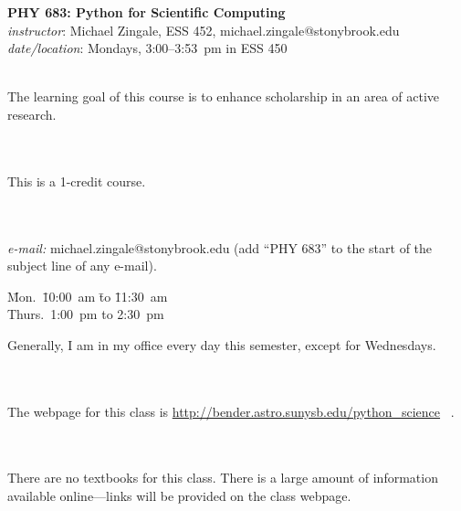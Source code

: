 \documentclass[11pt]{article}
\begin{document}
\begin{center}
{\Large \bf PHY 683: Python for Scientific Computing} \\[0.25em]
{\em instructor}\/: Michael Zingale, ESS 452, michael.zingale@stonybrook.edu \\
{\em date/location}\/: Mondays, 3:00--3:53~pm in ESS 450
\end{center}

 \\
The learning goal of this course is to enhance scholarship in an area
of active research.

\ \\
 \\
This is a 1-credit course.


\ \\
  \\
{\em e-mail:} michael.zingale@stonybrook.edu ({add ``PHY 683'' to the
 start of the subject line of any e-mail}). 
%
\begin{tabbing}
 \= Mon.\ \=10:00~am \=to \=11:30~am \\
                              \> Thurs.\ \>\phantom{0}1:00~pm \>to \>\phantom{0}2:30~pm 
\end{tabbing}
Generally, I am in my office every day this semester, except for Wednesdays.

\ \\
 \\
The webpage for this class is \url{http://bender.astro.sunysb.edu/python_science} \, .

\ \\
 \\
There are no textbooks for this class.  There is a large amount of 
information available online---links will be provided on the class webpage.
\end{document}
